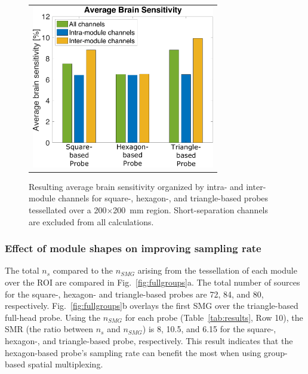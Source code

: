 \begin{figure}
    \begin{center}
    \begin{tabular}{c}
    \includegraphics[width=8cm]{fig/moca/Fig_6.pdf}
    \end{tabular}
    \end{center}
    \caption {Resulting average brain sensitivity organized by intra- and inter-module channels for square-, hexagon-, and triangle-based probes tessellated over a 200$\times$200~mm region. Short-separation channels are excluded from all calculations.} 
    \label{fig:fullbrainsensitivity}
\end{figure} 


\subsubsection{Effect of module shapes on improving sampling rate}
The total $n_s$ compared to the $n_{SMG}$ arising from the tessellation of each module over the \ac{ROI} are compared in Fig.~\ref{fig:fullgroups}a. The total number of sources for the square-, hexagon- and triangle-based probes are 72, 84, and 80, respectively. Fig.~\ref{fig:fullgroups}b overlays the first SMG over the triangle-based full-head probe. Using the $n_{SMG}$ for each probe (Table~\ref{tab:results}, Row 10), the SMR (the ratio between $n_s$ and $n_{SMG}$) is 8, 10.5, and 6.15 for the square-, hexagon-, and triangle-based probe, respectively. This result indicates that the hexagon-based probe's sampling rate can benefit the most when using  group-based spatial multiplexing.

